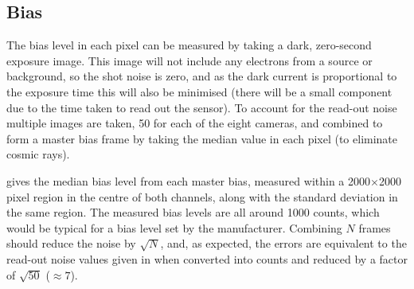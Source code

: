 \begin{colsection}
\begin{colsection}
\clearpage

\end{colsection}

\newpage
\subsection{Bias}
\label{sec:bias}
\begin{colsection}

The bias level in each pixel can be measured by taking a dark, zero-second exposure image. This image will not include any electrons from a source or background, so the shot noise is zero, and as the dark current is proportional to the exposure time this will also be minimised (there will be a small component due to the time taken to read out the sensor). To account for the read-out noise multiple images are taken, 50 for each of the eight cameras, and combined to form a master bias frame by taking the median value in each pixel (to eliminate cosmic rays).

 gives the median bias level from each master bias, measured within a 2000$\times$2000 pixel region in the centre of both channels, along with the standard deviation in the same region. The measured bias levels are all around 1000 counts, which would be typical for a bias level set by the manufacturer. Combining $N$ frames should reduce the noise by $\sqrt{N}$, and, as expected, the errors are equivalent to the read-out noise values given in  when converted into counts and reduced by a factor of $\sqrt{50}$ ($\approx 7$).


\end{colsection}
\end{colsection}

